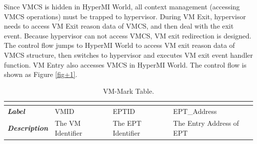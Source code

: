 \documentclass[conference]{IEEEtran}
\begin{document}

Since VMCS is hidden in HyperMI World, all context management (accessing VMCS operations) must be trapped to hypervisor. During VM Exit, hypervisor needs to access VM Exit reason data of VMCS, and then deal with the exit event.
 Because hypervisor can not access VMCS, VM exit redirection is designed. The control flow jumps to HyperMI World to access VM exit reason data of VMCS structure, then switches to hypervisor and executes VM exit event handler function. VM Entry also accesses VMCS in HyperMI World. The control flow is shown as Figure \ref{fig+1}.


\begin{table}[htbp]
\centering
\caption{VM-Mark Table.}\label{tab1}
\begin{tabular}{p{1.4cm}|p{1.2cm}|p{1.1cm}|p{1.7cm}}
\hline
\multicolumn{4}{c}{\bfseries\textbf\centering{VM-Mark Table}}\\
\hline
{\itshape\bfseries Label} & VMID & EPTID & EPT\_Address\\
\hline
{\itshape\bfseries Description} & { The VM Identifier} & The EPT Identifier & The Entry Address of EPT\\
\hline
\end{tabular}
\end{table}
\end{document}
